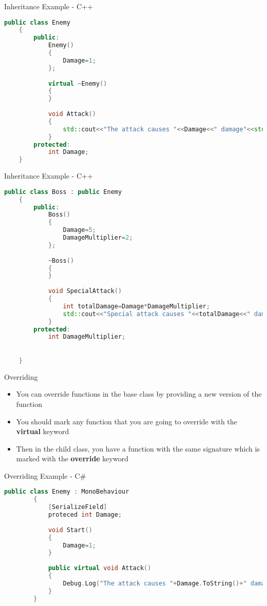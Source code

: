 \begin{frame}[fragile]{Inheritance Example - C++}
	\begin{lstlisting}[language=C++,basicstyle=\tiny,]
	public class Enemy
	{
		public:
			Enemy()
			{
				Damage=1;
			};
			
			virtual ~Enemy()
			{
			}
			
			void Attack()
			{
				std::cout<<"The attack causes "<<Damage<<" damage"<<std::endl;
			}
		protected:
			int Damage;
	}
	\end{lstlisting}
\end{frame}

\begin{frame}[fragile]{Inheritance Example - C++}
	\begin{lstlisting}[language=C++,basicstyle=\tiny,]
	public class Boss : public Enemy
	{
		public:
			Boss()
			{
				Damage=5;
				DamageMultiplier=2;
			};
			
			~Boss()
			{
			}
			
			void SpecialAttack()
			{
				int totalDamage=Damage*DamageMultiplier;
				std::cout<<"Special attack causes "<<totalDamage<<" damage"<<std::endl;
			}	
		protected:
			int DamageMultiplier;
		

	}
	\end{lstlisting}
\end{frame}

\begin{frame}{Overriding}
	\begin{itemize}
		\pause \item You can override functions in the base class by providing a new version of the function
		\pause \item You should mark any function that you are going to override with the \textbf{virtual} keyword 
		\pause \item Then in the child class, you have a function with the same signature which is marked with the \textbf{override} keyword
	\end{itemize}
\end{frame}

\begin{frame}[fragile]{Overriding Example - C\#}
	\begin{lstlisting}[language=C++,basicstyle=\tiny,]
		public class Enemy : MonoBehaviour
		{
			[SerializeField]
			proteced int Damage;
		
			void Start()
			{
				Damage=1;
			}
		
			public virtual void Attack()
			{
				Debug.Log("The attack causes "+Damage.ToString()+" damage");
			}
		}
	\end{lstlisting}
\end{frame}

